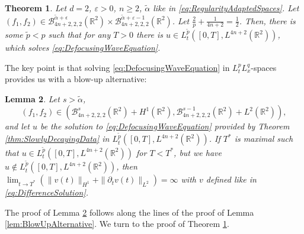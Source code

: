 \documentclass{amsart}
\newtheorem{theorem}{Theorem}[section]
\newtheorem{lemma}[theorem]{Lemma}
\theoremstyle{definition}
\newcommand{\R}{\mathbb{R}}
\newcommand {\Rtwo}{\mathbb{R}^{2}}
\numberwithin{equation}{section}
\begin{document}
\begin{theorem}
\label{thm:GWPSlowerDecay}
Let $d=2$, $\varepsilon >0$, $n \geq 2$, $\tilde{\alpha}$ like in \eqref{eq:RegularityAdaptedSpaces}. Let $(f_1,f_2) \in \mathcal{B}^{\tilde{\alpha}+\epsilon}_{4n+2,2,2}(\Rtwo) \times \mathcal{B}^{\tilde{\alpha}+\varepsilon - 1}_{4n+2,2,2}(\Rtwo)$. Let $\frac{2}{p} + \frac{1}{4n+2} = \frac{1}{2}$. Then, there is some $\tilde{p} < p$ such that for any $T > 0$ there is $u \in L_t^{\tilde{p}}([0,T],L^{4n+2}(\R^2))$, which solves \eqref{eq:DefocusingWaveEquation}.
\end{theorem}
The key point is that solving \eqref{eq:DefocusingWaveEquation} in $L_t^p L_x^q$-spaces provides us with a blow-up alternative:

\begin{lemma}
\label{lem:BlowUpSlowerDecayingData}
Let $s > \tilde{\alpha}$, 
\[
(f_1,f_2) \in (\mathcal{B}^s_{4n+2,2,2}(\R^2) + H^1(\R^2),\mathcal{B}^{s-1}_{4n+2,2,2}(\R^2) + L^2(\R^2)),
\]
 and let $u$ be the solution to \eqref{eq:DefocusingWaveEquation} provided by Theorem \ref{thm:SlowlyDecayingData} in $L_t^{\tilde{p}}([0,T],L^{4n+2}(\R^2))$. If $T^*$ is maximal such that $u \in L_t^{\tilde{p}}([0,T],L^{4n+2}(\R^2))$ for $T < T^*$, but we have $u \notin L_t^{\tilde{p}}([0,T],L^{4n+2}(\R^2))$, then $\lim_{t \to T^*}(\| v(t) \|_{H^1} + \| \partial_t v(t) \|_{L^2}) = \infty$ with $v$ defined like in \eqref{eq:DifferenceSolution}.
\end{lemma}
The proof of Lemma \ref{lem:BlowUpSlowerDecayingData} follows along the lines of the proof of Lemma \ref{lem:BlowUpAlternative}. We turn to the proof of Theorem \ref{thm:GWPSlowerDecay}.
\end{document}
